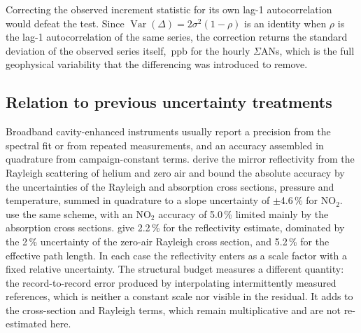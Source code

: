 Correcting the observed increment statistic for its own lag-1 autocorrelation would defeat the test. Since
$\operatorname{Var}(\Delta) = 2\sigma^2(1-\rho)$ is an identity when $\rho$ is the lag-1 autocorrelation of the same
series, the correction returns the standard deviation of the observed series itself, \,ppb for the hourly
$\Sigma$ANs, which is the full geophysical variability that the differencing was introduced to remove.

\subsection{Relation to previous uncertainty treatments}
\label{sec:4.6}

Broadband cavity-enhanced instruments usually report a precision from the spectral fit or from repeated
measurements, and an accuracy assembled in quadrature from campaign-constant terms. \citet{Washenfelder_2008} derive
the mirror reflectivity from the Rayleigh scattering of helium and zero air and bound the absolute accuracy by the
uncertainties of the Rayleigh and absorption cross sections, pressure and temperature, summed in quadrature to a
slope uncertainty of $\pm$4.6\,\% for NO$_2$. \citet{Min_2016} use the same scheme, with an NO$_2$ accuracy of 5.0\,\%
limited mainly by the absorption cross sections. \citet{Nam_2022} give 2.2\,\% for the reflectivity estimate,
dominated by the 2\,\% uncertainty of the zero-air Rayleigh cross section, and 5.2\,\% for the effective path length.
In each case the reflectivity enters as a scale factor with a fixed relative uncertainty. The structural budget
measures a different quantity: the record-to-record error produced by interpolating intermittently measured
references, which is neither a constant scale nor visible in the residual. It adds to the cross-section and Rayleigh
terms, which remain multiplicative and are not re-estimated here.

